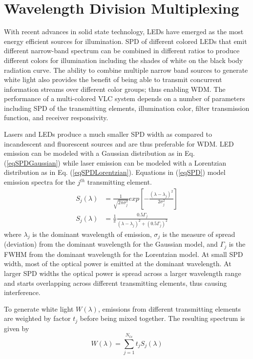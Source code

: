 \section{Wavelength Division Multiplexing}\label{sec:wdm}
With recent advances in solid state technology, LEDs have emerged as the most energy efficient sources for illumination. SPD of different colored LEDs that emit different narrow-band spectrum can be combined in different ratios to produce different colors for illumination including the shades of white on the black body radiation curve. The ability to combine multiple narrow band sources to generate white light also provides the benefit of being able to transmit concurrent information streams over different color groups; thus enabling WDM. The performance of a multi-colored VLC system depends on a number of parameters including SPD of the transmitting elements, illumination color, filter transmission function, and receiver responsivity.

Lasers and LEDs produce a much smaller SPD width as compared to incandescent and fluorescent sources and are thus preferable for WDM. LED emission can be modeled with a Gaussian distribution as in Eq. (\ref{eqSPDGaussian}) while laser emission can be modeled with a Lorentzian distribution as in Eq. (\ref{eqSPDLorentzian}). Equations in (\ref{eqSPD}) model emission spectra for the $j^{th}$ transmitting element.
\setlength{\arraycolsep}{0.0em}
\begin{subequations}
\begin{align}
S_j(\lambda) &= \frac{1}{\sqrt{2\pi\sigma_j^2}}exp\left[-\frac{(\lambda-\lambda_j)^2}{2\sigma_j^2}\right]\label{eqSPDGaussian}\\
S_j(\lambda) &= \frac{1}{\pi}\frac{0.5\Gamma_j}{(\lambda-\lambda_j)^2 + (0.5\Gamma_j)^2}\label{eqSPDLorentzian}
\end{align}
\label{eqSPD}
\end{subequations}
\setlength{\arraycolsep}{5pt} 
where $\lambda_j$ is the dominant wavelength of emission, $\sigma_j$ is the measure of spread (deviation) from the dominant wavelength for the Gaussian model, and $\Gamma_j$ is the FWHM from the dominant wavelength for the Lorentzian model. At small SPD width, most of the optical power is emitted at the dominant wavelength. At larger SPD widths the optical power is spread across a larger wavelength range and starts overlapping across different transmitting elements, thus causing interference.

To generate white light $W(\lambda)$, emissions from different transmitting elements are weighted by factor $t_j$ before being mixed together. The resulting spectrum is given by
\begin{equation}
	\label{eqWhite}
	W(\lambda) = \sum_{j=1}^{N_{tx}}t_jS_j(\lambda)
\end{equation}

